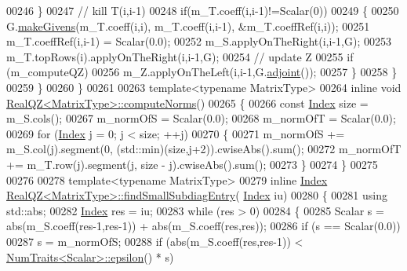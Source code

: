 \begin{DoxyCode}
00246           \}
00247           \textcolor{comment}{// kill T(i,i-1)}
00248           \textcolor{keywordflow}{if}(m\_T.coeff(i,i-1)!=Scalar(0))
00249           \{
00250             G.\hyperlink{group___jacobi___module_af73c81e9cc139b7e0d877ce553b02ec0}{makeGivens}(m\_T.coeff(i,i), m\_T.coeff(i,i-1), &m\_T.coeffRef(i,i));
00251             m\_T.coeffRef(i,i-1) = Scalar(0.0);
00252             m\_S.applyOnTheRight(i,i-1,G);
00253             m\_T.topRows(i).applyOnTheRight(i,i-1,G);
00254             \textcolor{comment}{// update Z}
00255             \textcolor{keywordflow}{if} (m\_computeQZ)
00256               m\_Z.applyOnTheLeft(i,i-1,G.\hyperlink{group___jacobi___module_a89c8ea615f8fa77ddd5810a1e5fde4da}{adjoint}());
00257           \}
00258         \}
00259       \}
00260     \}
00261 
00263   \textcolor{keyword}{template}<\textcolor{keyword}{typename} MatrixType>
00264     \textcolor{keyword}{inline} \textcolor{keywordtype}{void} \hyperlink{group___eigenvalues___module_class_eigen_1_1_real_q_z}{RealQZ<MatrixType>::computeNorms}()
00265     \{
00266       \textcolor{keyword}{const} \hyperlink{group___eigenvalues___module_a6201e534e901b5f4e66f72c176b534a3}{Index} size = m\_S.cols();
00267       m\_normOfS = Scalar(0.0);
00268       m\_normOfT = Scalar(0.0);
00269       \textcolor{keywordflow}{for} (\hyperlink{group___eigenvalues___module_a6201e534e901b5f4e66f72c176b534a3}{Index} j = 0; j < size; ++j)
00270       \{
00271         m\_normOfS += m\_S.col(j).segment(0, (std::min)(size,j+2)).cwiseAbs().sum();
00272         m\_normOfT += m\_T.row(j).segment(j, size - j).cwiseAbs().sum();
00273       \}
00274     \}
00275 
00276 
00278   \textcolor{keyword}{template}<\textcolor{keyword}{typename} MatrixType>
00279     \textcolor{keyword}{inline} \hyperlink{group___eigenvalues___module_a6201e534e901b5f4e66f72c176b534a3}{Index} \hyperlink{group___eigenvalues___module_class_eigen_1_1_real_q_z}{RealQZ<MatrixType>::findSmallSubdiagEntry}(
      \hyperlink{group___eigenvalues___module_a6201e534e901b5f4e66f72c176b534a3}{Index} iu)
00280     \{
00281       \textcolor{keyword}{using} std::abs;
00282       \hyperlink{group___eigenvalues___module_a6201e534e901b5f4e66f72c176b534a3}{Index} res = iu;
00283       \textcolor{keywordflow}{while} (res > 0)
00284       \{
00285         Scalar s = abs(m\_S.coeff(res-1,res-1)) + abs(m\_S.coeff(res,res));
00286         \textcolor{keywordflow}{if} (s == Scalar(0.0))
00287           s = m\_normOfS;
00288         \textcolor{keywordflow}{if} (abs(m\_S.coeff(res,res-1)) < \hyperlink{group___core___module_struct_eigen_1_1_num_traits}{NumTraits<Scalar>::epsilon}() * s)

\end{DoxyCode}
